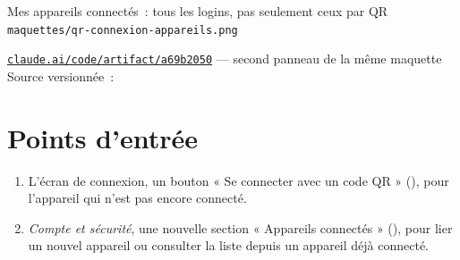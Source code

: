 \begin{center}
    {Mes appareils connectés~: tous les logins, pas seulement ceux par QR\\
     \texttt{maquettes/qr-connexion-appareils.png}}
\end{center}

\begin{note}
\href{https://claude.ai/code/artifact/a69b2050-b2dc-4aa1-a204-59ada2526a86}%
{\texttt{claude.ai/code/artifact/a69b2050}} --- second panneau de la même maquette\\
Source versionnée~: 
\end{note}

\section{Points d'entrée}

\begin{enumerate}[leftmargin=1.6em]
  \item L'écran de connexion, un bouton « Se connecter avec un code QR »
        (), pour l'appareil
        qui n'est pas encore connecté.
  \item \emph{Compte et sécurité}, une nouvelle section « Appareils connectés »
        (),
        pour lier un nouvel appareil ou consulter la liste depuis un appareil déjà
        connecté.
\end{enumerate}
